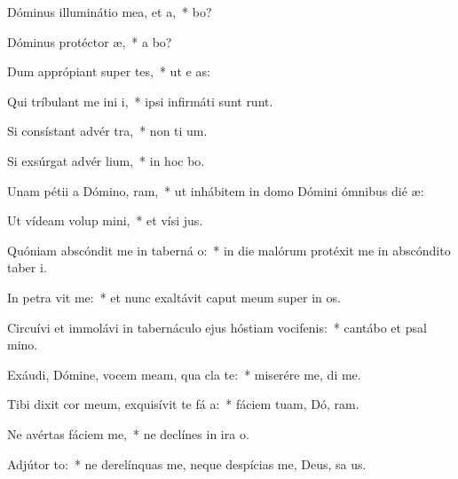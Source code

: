 \item Dóminus illuminátio mea, et  a,~*  bo?
\item Dóminus protéctor  æ,~* a  bo?
\item Dum apprópiant super  tes,~* ut e  as:
\item Qui tríbulant me ini i,~* ipsi infirmáti sunt  runt.
\item Si consístant advér  tra,~* non ti  um.
\item Si exsúrgat advér  lium,~* in hoc  bo.
\item Unam pétii a Dómino,  ram,~* ut inhábitem in domo Dómini ómnibus dié  æ:
\item Ut vídeam volup mini,~* et vísi  jus.
\item Quóniam abscóndit me in taberná o:~* in die malórum protéxit me in abscóndito taber i.
\item In petra vit me:~* et nunc exaltávit caput meum super in os.
\item Circuívi et immolávi in tabernáculo ejus hóstiam vocifenis:~* cantábo et psal  mino.
\item Exáudi, Dómine, vocem meam, qua cla  te:~* miserére me,  di me.
\item Tibi dixit cor meum, exquisívit te fá a:~* fáciem tuam, Dó, ram.
\item Ne avértas fáciem   me,~* ne declínes in ira   o.
\item Adjútor  to:~* ne derelínquas me, neque despícias me, Deus, sa us.
